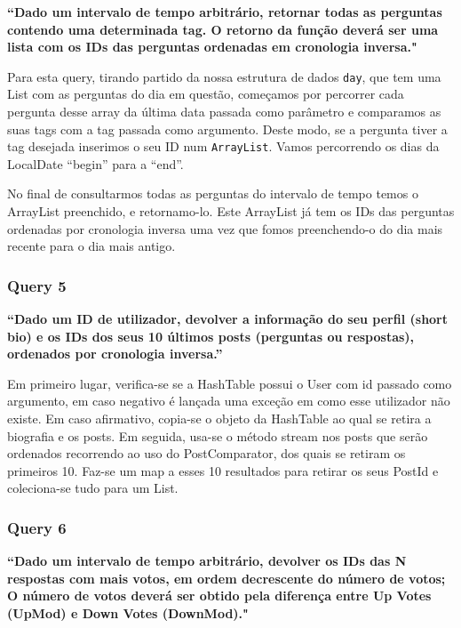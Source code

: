 \documentclass[a4paper]{article}
\begin{document}
\textbf{“Dado um intervalo de tempo arbitrário, retornar todas as perguntas contendo uma determinada tag.
O retorno da função deverá ser uma lista com os IDs das perguntas ordenadas em cronologia inversa."}

\vspace{0.1cm}

Para esta query, tirando partido da nossa estrutura de dados \texttt{day},
que tem uma \textsf{List} com as perguntas do dia em questão,
começamos por percorrer cada pergunta desse array
da última data passada como parâmetro e comparamos as suas tags com a tag passada como argumento.
Deste modo, se a pergunta tiver a tag desejada inserimos o seu ID num \texttt{ArrayList}.
Vamos percorrendo os dias da LocalDate “begin” para a “end”.

No final de consultarmos todas as perguntas do intervalo de tempo temos o
ArrayList preenchido, e retornamo-lo.
Este ArrayList já tem os IDs das perguntas ordenadas por cronologia inversa uma vez que
fomos preenchendo-o do dia mais recente para o dia mais antigo.



\subsubsection*{Query 5}
\label{sec:query5}

\textbf{“Dado um ID de utilizador,  devolver a informação do
seu perfil (short bio) e os IDs dos seus 10 últimos posts (perguntas ou respostas),
ordenados por cronologia inversa.”}

\vspace{0.1cm}

Em primeiro lugar, verifica-se se a HashTable possui o User com id passado como
argumento, em caso negativo é lançada uma exceção em como esse utilizador não
existe.
Em caso afirmativo, copia-se o objeto da HashTable ao qual se retira a
biografia e os posts. Em seguida, usa-se o método stream nos posts que serão
ordenados recorrendo ao uso do PostComparator, dos quais se retiram os primeiros
10. Faz-se um map a esses 10 resultados para retirar os seus PostId e
coleciona-se tudo para um List.


\subsubsection*{Query 6}
\label{sec:query6}

\textbf{“Dado um intervalo de tempo arbitrário, devolver os IDs das N respostas
com mais votos, em ordem decrescente do número de votos; O número de votos deverá
ser obtido pela diferença entre Up Votes (UpMod) e Down Votes (DownMod)."}
\end{document}
